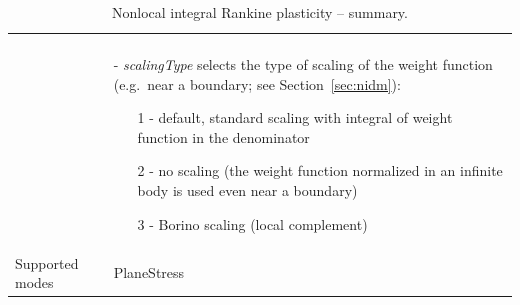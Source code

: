 \documentclass[a4paper]{article}
\newcommand{\param}[1]{{\it #1}}
\newenvironment{mmt}{\begin{tabular}{|l|p{9cm}|}}{\end{tabular}\\}
\newenvironment{mmt}{\begin{tabular}{|l|l|}}{\end{tabular}\\}
\begin{document}
\begin{table}[!htb]
\begin{mmt}
\begin{itemize}
\end{itemize}\\
&- \param{scalingType} selects the type of scaling of the weight function (e.g.\ near a boundary; see Section~\ref{sec:nidm}):
\begin{itemize}\setlength{\itemsep}{-5pt}
\item[1 -] default, standard scaling with integral of weight function in the denominator
\item[2 -] no scaling (the weight function normalized in an infinite body is used even near a boundary)
\item[3 -] Borino scaling (local complement)
\end{itemize}\\
Supported modes& PlaneStress\\
\hline
\end{mmt}
\caption{Nonlocal integral Rankine plasticity -- summary.}
\label{rankineMatNl_table}
\end{table}
\end{document}
